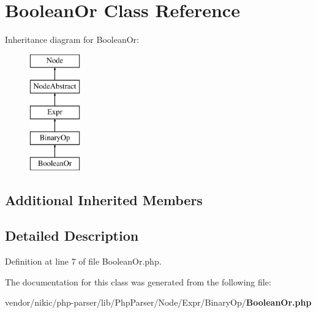 \section{Boolean\+Or Class Reference}
\label{class_php_parser_1_1_node_1_1_expr_1_1_binary_op_1_1_boolean_or}
Inheritance diagram for Boolean\+Or\+:\begin{figure}[H]
\begin{center}
\leavevmode
\includegraphics[height=5.000000cm]{class_php_parser_1_1_node_1_1_expr_1_1_binary_op_1_1_boolean_or}
\end{center}
\end{figure}
\subsection*{Additional Inherited Members}


\subsection{Detailed Description}


Definition at line 7 of file Boolean\+Or.\+php.



The documentation for this class was generated from the following file\+:\begin{DoxyCompactItemize}
\item 
vendor/nikic/php-\/parser/lib/\+Php\+Parser/\+Node/\+Expr/\+Binary\+Op/{\bf Boolean\+Or.\+php}\end{DoxyCompactItemize}

